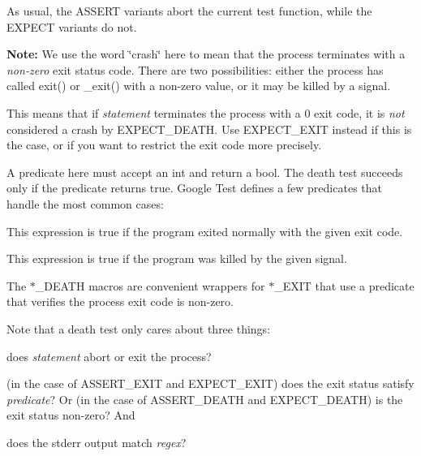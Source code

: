 As usual, the {\ttfamily A\+S\+S\+E\+RT} variants abort the current test function, while the {\ttfamily E\+X\+P\+E\+CT} variants do not.

{\bfseries{Note\+:}} We use the word \char`\"{}crash\char`\"{} here to mean that the process terminates with a {\itshape non-\/zero} exit status code. There are two possibilities\+: either the process has called {\ttfamily exit()} or {\ttfamily \+\_\+exit()} with a non-\/zero value, or it may be killed by a signal.

This means that if {\itshape statement} terminates the process with a 0 exit code, it is {\itshape not} considered a crash by {\ttfamily E\+X\+P\+E\+C\+T\+\_\+\+D\+E\+A\+TH}. Use {\ttfamily E\+X\+P\+E\+C\+T\+\_\+\+E\+X\+IT} instead if this is the case, or if you want to restrict the exit code more precisely.

A predicate here must accept an {\ttfamily int} and return a {\ttfamily bool}. The death test succeeds only if the predicate returns {\ttfamily true}. Google Test defines a few predicates that handle the most common cases\+:


\begin{DoxyCode}{0}
\end{DoxyCode}


This expression is {\ttfamily true} if the program exited normally with the given exit code.


\begin{DoxyCode}{0}
\end{DoxyCode}


This expression is {\ttfamily true} if the program was killed by the given signal.

The {\ttfamily $\ast$\+\_\+\+D\+E\+A\+TH} macros are convenient wrappers for {\ttfamily $\ast$\+\_\+\+E\+X\+IT} that use a predicate that verifies the process\textquotesingle{} exit code is non-\/zero.

Note that a death test only cares about three things\+:


\begin{DoxyEnumerate}
\item does {\itshape statement} abort or exit the process?
\end{DoxyEnumerate}
\begin{DoxyEnumerate}
\item (in the case of {\ttfamily A\+S\+S\+E\+R\+T\+\_\+\+E\+X\+IT} and {\ttfamily E\+X\+P\+E\+C\+T\+\_\+\+E\+X\+IT}) does the exit status satisfy {\itshape predicate}? Or (in the case of {\ttfamily A\+S\+S\+E\+R\+T\+\_\+\+D\+E\+A\+TH} and {\ttfamily E\+X\+P\+E\+C\+T\+\_\+\+D\+E\+A\+TH}) is the exit status non-\/zero? And
\end{DoxyEnumerate}
\begin{DoxyEnumerate}
\item does the stderr output match {\itshape regex}?
\end{DoxyEnumerate}

